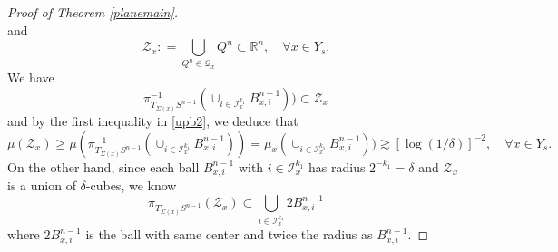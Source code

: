 \documentclass[11pt,a4paper,reqno]{amsart}
\newcommand{\R}{\mathbb{R}}
\newcommand{\calQ}{\mathcal{Q}}
\newcommand{\calZ}{\mathcal{Z}}
\newcommand{\1}{\mathbf{1}}
\numberwithin{equation}{section}
\theoremstyle{plain}
\theoremstyle{definition}
\theoremstyle{remark}
\begin{document}
\begin{proof}[Proof of Theorem \ref{planemain}]
\begin{equation}
\end{equation}
and
\begin{equation}\label{zxk}
  \calZ_x : =  \bigcup_{Q^n \in \calQ_x}Q^n \subset \R^n, \quad \forall x \in Y_s.
\end{equation}
We have
$$ \pi_{T_{\Sigma(x)}S^{n-1}}^{-1}(\cup_{i \in \mathcal{I}_x^{k_1}}B_{x,i}^{n-1})) \subset \calZ_x $$
and by the first inequality in \eqref{upb2}, we deduce that
\begin{equation}\label{muzx}
  \mu(\calZ_x) \ge  \mu(\pi_{T_{\Sigma(x)}S^{n-1}}^{-1}(\cup_{i \in \mathcal{I}_x^{k_1}}B_{x,i}^{n-1})) = \mu_x(\cup_{i \in \mathcal{I}_x^{k_1}}B_{x,i}^{n-1}))\gtrsim [\log(1/\delta)]^{-2}, \quad \forall x \in Y_s.
\end{equation}
On the other hand, since each ball $B_{x,i}^{n-1}$ with $i \in \mathcal{I}_x^{k_1}$ has radius $2^{-k_1}=\delta$ and $\calZ_x$ is a union of $\delta$-cubes, we know
\begin{equation}\label{inclzx}
  \pi_{T_{\Sigma(x)}S^{n-1}}(\calZ_x) \subset \bigcup_{i \in \mathcal{I}_x^{k_1}} 2B_{x,i}^{n-1}
\end{equation}
where $2B_{x,i}^{n-1}$ is the ball with same center and twice the radius as $B_{x,i}^{n-1}$.


\end{proof}
\end{document}
